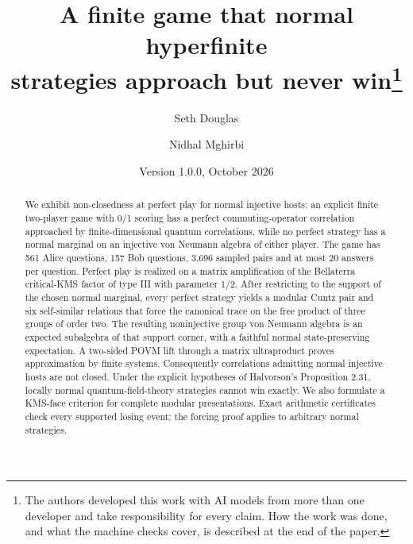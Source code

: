 \documentclass[11pt]{article}
\title{A finite game that normal hyperfinite\\strategies approach but never win\thanks{The authors developed this work with AI models from more than one developer and take responsibility for every claim. How the work was done, and what the machine checks cover, is described at the end of the paper.}}
\author{Seth Douglas \and Nidhal Mghirbi}
\date{Version 1.0.0, October 2026}
\theoremstyle{definition}
\begin{document}
\maketitle
\begin{abstract}
We exhibit non-closedness at perfect play for normal injective hosts: an explicit finite two-player game with 0/1 scoring has a perfect commuting-operator correlation approached by finite-dimensional quantum correlations, while no perfect strategy has a normal marginal on an injective von Neumann algebra of either player. The game has 561 Alice questions, 157 Bob questions, 3,696 sampled pairs and at most 20 answers per question. Perfect play is realized on a matrix amplification of the Bellaterra critical-KMS factor of type III with parameter 1/2. After restricting to the support of the chosen normal marginal, every perfect strategy yields a modular Cuntz pair and six self-similar relations that force the canonical trace on the free product of three groups of order two. The resulting noninjective group von Neumann algebra is an expected subalgebra of that support corner, with a faithful normal state-preserving expectation. A two-sided POVM lift through a matrix ultraproduct proves approximation by finite systems. Consequently correlations admitting normal injective hosts are not closed. Under the explicit hypotheses of Halvorson's Proposition 2.31, locally normal quantum-field-theory strategies cannot win exactly. We also formulate a KMS-face criterion for complete modular presentations. Exact arithmetic certificates check every supported losing event; the forcing proof applies to arbitrary normal strategies.
\end{abstract}











\end{document}
